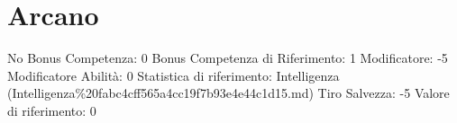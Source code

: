 \section{Arcano}\label{arcano}

\begin{description}
\tightlist
\item[Tags: ABI]
No Bonus Competenza: 0 Bonus Competenza di Riferimento: 1 Modificatore:
-5 Modificatore Abilità: 0 Statistica di riferimento: Intelligenza
(Intelligenza\%20fabc4cff565a4cc19f7b93e4e44c1d15.md) Tiro Salvezza: -5
Valore di riferimento: 0
\end{description}
